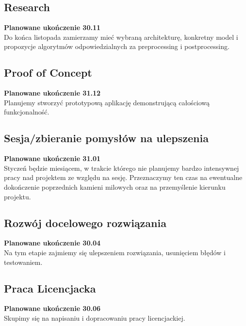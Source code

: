 \documentclass[12pt]{article}
\begin{document}
\subsection*{Research}
\textbf{Planowane ukończenie 30.11}\\
Do końca listopada zamierzamy mieć wybraną architekturę, konkretny model i propozycje algorytmów odpowiedzialnych za preprocessing i postprocessing.
\subsection*{Proof of Concept}
\textbf{Planowane ukończenie 31.12}\\
Planujemy stworzyć prototypową aplikację demonstrującą całościową funkcjonalność.
\subsection*{Sesja/zbieranie pomysłów na ulepszenia}
\textbf{Planowane ukończenie 31.01}\\
Styczeń będzie miesiącem, w trakcie którego nie planujemy bardzo intensywnej pracy nad projektem ze względu na sesję. Przeznaczymy ten czas na ewentualne dokończenie poprzednich kamieni milowych oraz na przemyślenie kierunku projektu.
\subsection*{Rozwój docelowego rozwiązania}
\textbf{Planowane ukończenie 30.04}\\
Na tym etapie zajmiemy się ulepszeniem rozwiązania, usunięciem błędów i testowaniem.
\subsection*{Praca Licencjacka}
\textbf{Planowane ukończenie 30.06}\\
Skupimy się na napisaniu i dopracowaniu pracy licencjackiej.



\end{document}
